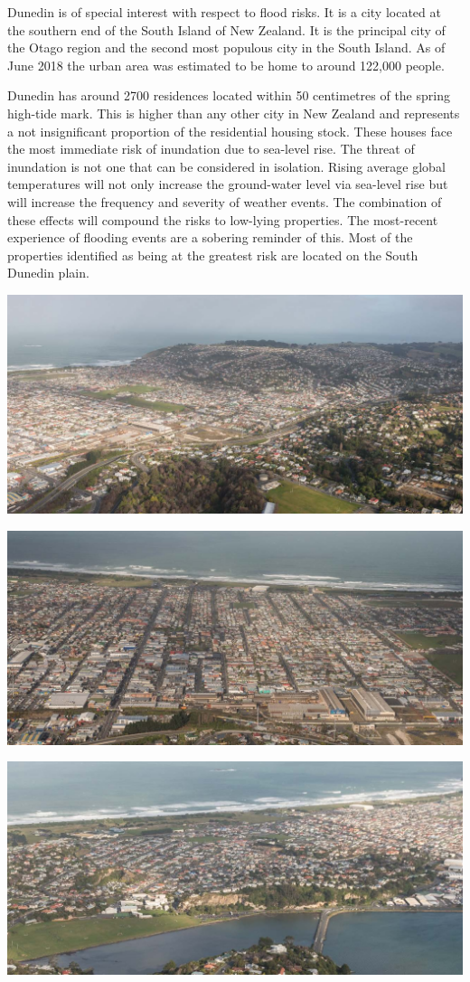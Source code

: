 \documentclass[]{article}
\begin{document}
Dunedin is of special interest with respect to flood risks. It is a city
located at the southern end of the South Island of New Zealand. It is
the principal city of the Otago region and the second most populous city
in the South Island. As of June 2018 the urban area was estimated to be
home to around 122,000 people.

Dunedin has around 2700 residences located within 50 centimetres of the
spring high-tide mark. This is higher than any other city in New Zealand
and represents a not insignificant proportion of the residential housing
stock. These houses face the most immediate risk of inundation due to
sea-level rise. The threat of inundation is not one that can be
considered in isolation. Rising average global temperatures will not
only increase the ground-water level via sea-level rise but will
increase the frequency and severity of weather events. The combination
of these effects will compound the risks to low-lying properties. The
most-recent experience of flooding events are a sobering reminder of
this. Most of the properties identified as being at the greatest risk
are located on the South Dunedin plain.

\begin{center}\includegraphics[width=0.5\linewidth]{../images/south_dunedin_aerial_1} \end{center}

\begin{center}\includegraphics[width=0.5\linewidth]{../images/south_dunedin_aerial_2} \end{center}

\begin{center}\includegraphics[width=0.5\linewidth]{../images/south_dunedin_aerial_3} \end{center}
\end{document}
